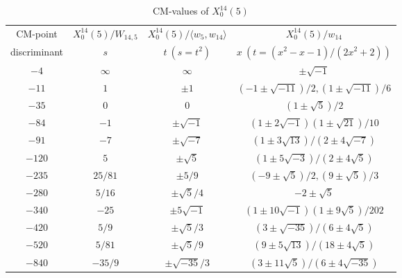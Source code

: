 \documentclass{amsart}
\theoremstyle{definition}
\begin{document}
\begin{appendices}
\begin{table}
\renewcommand{\arraystretch}{1.5}
\tabcolsep=10pt                         
\begin{tabular}{|c|c|c|c|}
\hline
CM-point& $X_{0}^{14}\left( 5\right)/ W_{14,5}$ & $X_{0}^{14}\left( 5\right)/\langle w_{5},w_{14}\rangle $ & $%
X_{0}^{14}\left( 5\right) /w_{14}$ \\
discriminant & $s$ & $t\ (s=t^2)$ & $x\ (t=(x^2-x-1)/(2x^2+2))$ \\ \hline
${-4}$ & $\infty$ & $\infty $ & $\pm\sqrt{-1} $ \\ 
${-11}$ & $1$ & $\pm 1$ & $(-1\pm \sqrt{-11})/{2},%
(1\pm \sqrt{-11})/{6}$ \\ 
${-35}$ & $0$ & $0$ & $(1\pm \sqrt{5})/{2}$ \\
${-84}$ & $-1$ & $\pm \sqrt{-1}$ & ${(1\pm 2\sqrt{-1})(1\pm\sqrt{21})}/{10}$ \\ 
${-91}$ & $-7$ & $\pm \sqrt{-7}$ & $({1\pm 3\sqrt{13}})/{(2\pm 4\sqrt{-7})}$ \\
${-120}$ & $5$ & $\pm \sqrt{5}$ & $(1\pm 5\sqrt{-3})/{(2\pm 4\sqrt{5})}$ \\ 
${-235}$ & ${25}/{81}$ & $\pm {5}/{9}$ & $(-9\pm\sqrt{5})/{2},(9\pm\sqrt{5})/{3}$ \\ 
${-280}$ & ${5}/{16} $ & $\pm{\sqrt{5}}/{4}$ & $-2\pm \sqrt{5}$ \\ 
${-340}$ & $-25$ & $\pm 5\sqrt{-1}$ & ${(1\pm 10\sqrt{-1})(1\pm 9\sqrt{5})}/{202}$ \\ 
${-420}$ & ${5}/{9}$ & $\pm {\sqrt{5}}/{3}$ & $(3\pm\sqrt{-35})/{(6\pm4\sqrt{5})}$ \\
${-520}$ & ${5}/{81}$ & $\pm {\sqrt{5}}/{9}$ & $(9\pm 5\sqrt{13})/{(18\pm4\sqrt{5})}$ \\
${-840}$ & $-{35}/{9}$ & $\pm {\sqrt{-35}}/{3}$ & $%
(3\pm11\sqrt{5})/{(6\pm4\sqrt{-35})}$ \\ \hline
\end{tabular}
\bigskip
\caption{CM-values of $X^{14}_0(5)$}
\end{table}


\end{appendices}
\end{document}

